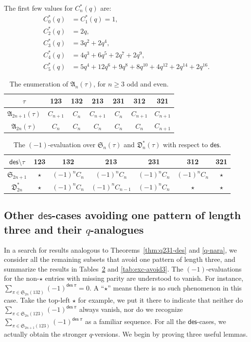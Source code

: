 \documentclass[12pt,reqno]{amsart}
\numberwithin{equation}{section}
\theoremstyle{plain}
\theoremstyle{definition}
\def\S{\mathfrak{S}}
\def\D{\mathfrak{D}}
\def\A{\mathfrak{A}}
\def\des{\mathsf{des}}
\begin{document}
The first few values for $C^{*}_n(q)$ are:
\begin{align*}
C^*_0(q) &=C^*_1(q)=1,\\
C^*_2(q) &=2q,\\
C^*_3(q) &=3q^2+2q^4,\\
C^*_4(q) &=4q^3+6q^5+2q^7+2q^9,\\
C^*_5(q) &=5q^4+12q^6+9q^8+8q^{10}+4q^{12}+2q^{14}+2q^{16}.
\end{align*}

\begin{table}[tbp]\caption{The enumeration of $\A_n(\tau)$, for $n\ge 3$ odd and even.}
\label{tab:alt-3}
\centering
\begin{tabular}{ccccccc}
\hline
$\tau$ &123 &132 &213 &231 &312 &321\\
\hline
$\A_{2n+1}(\tau)$ &$C_{n+1}$ &$C_n$ &$C_{n+1}$ &$C_n$ &$C_{n+1}$ &$C_{n+1}$ \\
$\A_{2n}(\tau)$ &$C_{n}$ &$C_n$ &$C_{n}$ &$C_n$ &$C_{n}$ &$C_{n+1}$ \\
\hline
\end{tabular}
\end{table}

\begin{table}[tbp]\caption{The $(-1)$-evaluation over $\S_n(\tau)$ and $\D^*_n(\tau)$ with respect to $\des$.}
\label{tab:avoid-3}
\centering
\begin{tabular}{ccccccc}
\hline
$\des\setminus \tau$ &123 &132 &213 &231 &312 &321\\
\hline
$\S_{2n+1}$ &$\star$ &$(-1)^nC_n$ &$(-1)^nC_n$ &$(-1)^nC_n$ &$(-1)^nC_n$ &$\star$ \\
$\D^*_{2n}$ &$\star$ &$(-1)^nC_n$ &$(-1)^nC_{n-1}$ &$(-1)^nC_n$ &$\star$ &$\star$ \\
\hline
\end{tabular}
\end{table}



\subsection{\texorpdfstring{Other $\des$-cases avoiding one pattern of length three and their $q$-analogues}{}}
In a search for results analogous to Theorems~\ref{thm:q231-des} and \ref{q-nara}, we consider all the remaining subsets that avoid one pattern of length three, and summarize the results in Tables~\ref{tab:avoid-3} and \ref{tab:exc-avoid3}. The $(-1)$-evaluations for the non-$\star$ entries with missing parity are understood to vanish. For instance, $\sum_{\pi\in\S_{2n}(132)}(-1)^{\des\:\pi}=0$. A ``$\star$'' means there is no such phenomenon in this case. Take the top-left $\star$ for example, we put it there to indicate that neither do $\sum_{\pi\in \S_{2n}(123)}(-1)^{\des\:\pi}$ always vanish, nor do we recognize $\sum_{\pi\in \S_{2n+1}(123)}(-1)^{\des\:\pi}$ as a familiar sequence. For all the $\des$-cases, we actually obtain the stronger $q$-versions. We begin by proving three useful lemmas.
\end{document}
